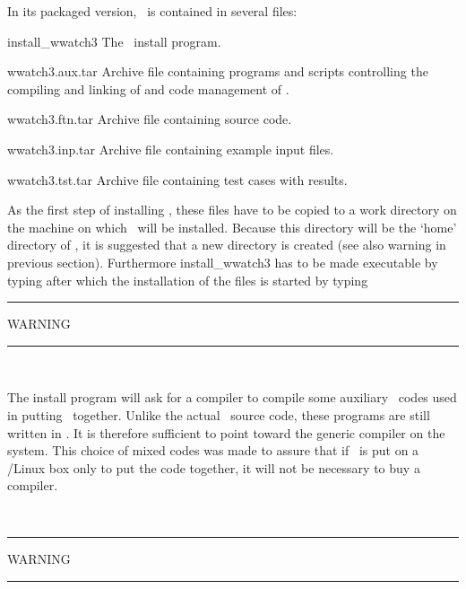 In its packaged version, \ws\ is contained in several files:

\begin{list}{???}{\parsep 0mm \itemsep 0mm 
                  \leftmargin 40mm \rightmargin 5mm
                   }
\item[{\file install\_wwatch3} \hfill]
The \ws\ install program. 
\item[{\file wwatch3.aux.tar} \hfill] Archive file containing programs and
scripts controlling the compiling and linking of and code management of \ws.
\item[{\file wwatch3.ftn.tar} \hfill]
Archive file containing source code.
\item[{\file wwatch3.inp.tar} \hfill]
Archive file containing example input files. 
\item[{\file wwatch3.tst.tar} \hfill]
Archive file containing test cases with results. 
\end{list}

\noindent
As the first step of installing \ws, these files have to be copied to a work
directory on the machine on which \ws\ will be installed. Because this
directory will be the `home' directory of \ws, it is suggested that a new
directory is created (see also warning in previous section). Furthermore
{\file install\_wwatch3} has to be made executable by typing  after which the installation of the files is started by
typing 

\begin{center}
\rule[1mm]{55mm}{1.0mm} WARNING \rule[1mm]{55mm}{1.0mm} \\ \vspace{\baselineskip}
\parbox{120mm}{The install program will ask for a compiler to compile some
auxiliary \fortran\ codes used in putting \ws\ together. Unlike the actual
\ws\ source code, these programs are still written in . It is
therefore sufficient to point toward the generic  compiler on the
system. This choice of mixed codes was made to assure that if \ws\ is put on a
\unix/Linux box only to put the code together, it will not be necessary to buy
a  compiler.} \\ \vspace{\baselineskip} \rule[1mm]{55mm}{1.0mm}
WARNING \rule[1mm]{55mm}{1.0mm}
\end{center}

